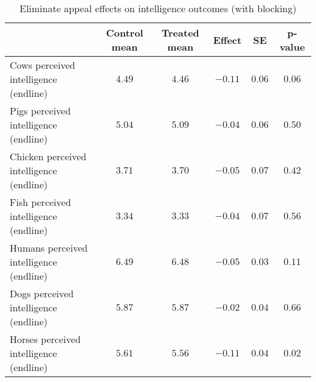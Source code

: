 \begin{table*}[ht]
\caption{Eliminate appeal effects on intelligence outcomes (with blocking)\label{round}} 
\begin{center}
\begin{tabular}{lccccc}
\hline\hline
\multicolumn{1}{l}{}&\multicolumn{1}{c}{Control mean}&\multicolumn{1}{c}{Treated mean}&\multicolumn{1}{c}{Effect}&\multicolumn{1}{c}{SE}&\multicolumn{1}{c}{p-value}\tabularnewline
\hline
Cows perceived intelligence (endline)&$4.49$&$4.46$&$-0.11$&$0.06$&$0.06$\tabularnewline
Pigs perceived intelligence (endline)&$5.04$&$5.09$&$-0.04$&$0.06$&$0.50$\tabularnewline
Chicken perceived intelligence (endline)&$3.71$&$3.70$&$-0.05$&$0.07$&$0.42$\tabularnewline
Fish perceived intelligence (endline)&$3.34$&$3.33$&$-0.04$&$0.07$&$0.56$\tabularnewline
Humans perceived intelligence (endline)&$6.49$&$6.48$&$-0.05$&$0.03$&$0.11$\tabularnewline
Dogs perceived intelligence (endline)&$5.87$&$5.87$&$-0.02$&$0.04$&$0.66$\tabularnewline
Horses perceived intelligence (endline)&$5.61$&$5.56$&$-0.11$&$0.04$&$0.02$\tabularnewline
\hline
\end{tabular}\end{center}

\end{table*}
